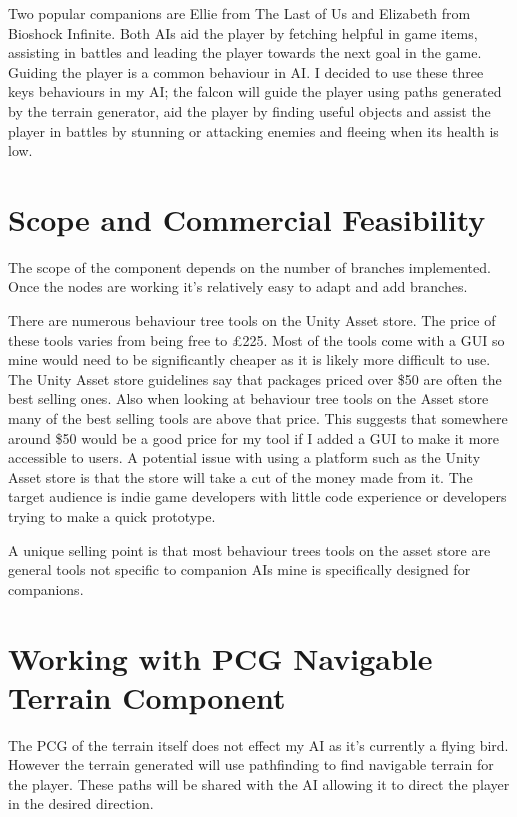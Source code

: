 \documentclass{scrartcl}
\begin{document}
\bigskip

Two popular companions are Ellie from The Last of Us and Elizabeth from Bioshock Infinite. Both AIs aid the player by fetching helpful in game items, assisting in battles and leading the player towards the next goal in the game.
Guiding the player is a common behaviour in AI. I decided to use these three keys behaviours in my AI; the falcon will guide the player using paths generated by the terrain generator, aid the player by finding useful objects and assist the player in battles by stunning or attacking enemies and fleeing when its health is low.

\section{Scope and Commercial Feasibility}

The scope of the component depends on the number of branches implemented. Once the nodes are working it's relatively easy to adapt and add branches.

There are numerous behaviour tree tools on the Unity Asset store. The price of these tools varies from being free to \pounds225. Most of the tools come with a GUI so mine would need to be significantly cheaper as it is likely more difficult to use.
The Unity Asset store guidelines say that packages priced over \$50 are often the best selling ones. Also when looking at behaviour tree tools on the Asset store many of the best selling tools are above that price. This suggests that somewhere around \$50 would be a good price for my tool if I added a GUI to make it more accessible to users.  A potential issue with using a platform such as the Unity Asset store is that the store will take a cut of the money made from it.
The target audience is indie game developers with little code experience or developers trying to make a quick prototype.
\bigskip

A unique selling point is that most behaviour trees tools on the asset store are general tools not specific to companion AIs mine is specifically designed for companions. 


\section{ Working with PCG Navigable Terrain Component }

The PCG of the terrain itself does not effect my AI as it's currently a flying bird. However the terrain generated will use pathfinding to find navigable terrain for the player. These paths will be shared with the AI allowing it  to direct the player in the desired direction. 



	
\end{document}
